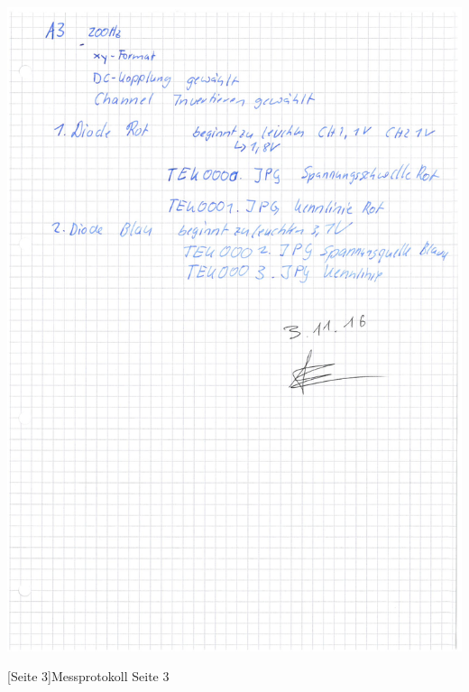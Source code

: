         \begin{center}
   		 	\includegraphics[scale=0.65]{Daten/1_Seite_3.jpg}
   	 	\end{center}
    	[Seite 3]{Messprotokoll Seite 3}
    	\pagebreak
    	